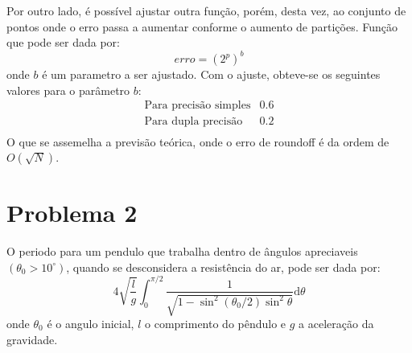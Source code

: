 \documentclass[a4paper,11pt, twoside]{article}
\begin{document}
    Por outro lado, é possível ajustar outra função, porém, desta vez, ao conjunto de pontos onde o 
    erro passa a aumentar conforme o aumento de partições. Função que pode 
    ser dada por:
    \begin{equation}
        erro = (2^p)^b
    \end{equation}
    onde $b$ é um parametro a ser ajustado.
    Com o ajuste,
    obteve-se os seguintes valores para o parâmetro $b$:
    \begin{eqnarray*}
        \textrm{Para precisão simples} & 0.6\\
        \textrm{Para dupla precisão} & 0.2\\
    \end{eqnarray*}
    O que se assemelha a previsão teórica, onde o erro de roundoff é da ordem de $O(\sqrt{N})$.
    
    \section*{Problema 2}
    O periodo para um pendulo que trabalha dentro de ângulos apreciaveis $(\theta_0 > 10^\circ)$,
    quando se desconsidera a resistência do ar, pode ser dada por:
    \begin{equation}\label{pendulo}
        4\sqrt{\frac{l}{g}}\int^{\pi/2}_0\frac{1}{\sqrt{1 - \sin^2(\theta_0 / 2)\sin^2\theta}}\mathrm{d}\theta
    \end{equation}
    onde $\theta_0$ é o angulo inicial, $l$ o comprimento do pêndulo e $g$ a aceleração da gravidade.
    
\end{document}
